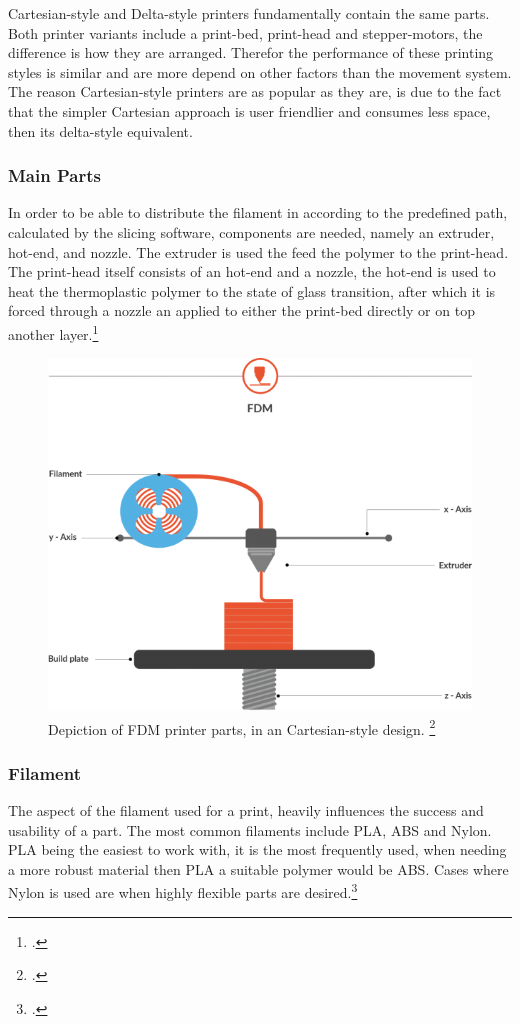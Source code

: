 Cartesian-style and Delta-style printers fundamentally contain the same parts. Both printer variants include a print-bed, print-head and stepper-motors, the difference is how they are arranged. Therefor the performance of these printing styles is similar and are more depend on other factors than the movement system. The reason Cartesian-style printers are as popular as they are, is due to the fact that the simpler Cartesian approach is user friendlier and consumes less space, then its delta-style equivalent.\newline

\subsubsection{Main Parts}

In order to be able to distribute the filament in according to the predefined path, calculated by the slicing software, components are needed, namely an extruder, hot-end, and nozzle. The extruder is used the feed the polymer to the print-head. The print-head itself consists of an hot-end and a nozzle, the hot-end is used to heat the thermoplastic polymer to the state of glass transition, after which it is forced through a nozzle an applied to either the print-bed directly or on top another layer.\footcite{all3dpFDM3DPrinting2020}


\begin{figure}[h]
	\centering
	\includegraphics[width=0.5\linewidth]{img/FDM_Principle}
	\caption{Depiction of FDM printer parts, in an Cartesian-style design. \footcite{druckwegeFusedDepositionModelling}}
	\label{fig:custom_parts_fdm_parts}
\end{figure}

\subsubsection{Filament}

The aspect of the filament used for a print, heavily influences the success and usability of a part. The most common filaments include PLA, ABS and Nylon. PLA being the easiest to work with, it is the most frequently used, when needing a more robust material then PLA a suitable polymer would be ABS. Cases where Nylon is used are when highly flexible parts are desired.\footcite{hubsIntroToFDM3DPrintingNoDate}


